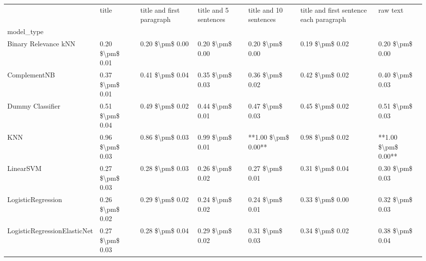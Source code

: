 \begin{tabular}{lllllll}
\toprule
{} &            title & title and first paragraph & title and 5 sentences & title and 10 sentences & title and first sentence each paragraph &             raw text \\
model\_type                      &                  &                           &                       &                        &                                         &                      \\
\midrule
Binary Relevance kNN            &  0.20 \$\textbackslash pm\$ 0.01 &           0.20 \$\textbackslash pm\$ 0.00 &       0.20 \$\textbackslash pm\$ 0.00 &        0.20 \$\textbackslash pm\$ 0.00 &                         0.19 \$\textbackslash pm\$ 0.02 &      0.20 \$\textbackslash pm\$ 0.00 \\
ComplementNB                    &  0.37 \$\textbackslash pm\$ 0.01 &           0.41 \$\textbackslash pm\$ 0.04 &       0.35 \$\textbackslash pm\$ 0.03 &        0.36 \$\textbackslash pm\$ 0.02 &                         0.42 \$\textbackslash pm\$ 0.02 &      0.40 \$\textbackslash pm\$ 0.03 \\
Dummy Classifier                &  0.51 \$\textbackslash pm\$ 0.04 &           0.49 \$\textbackslash pm\$ 0.02 &       0.44 \$\textbackslash pm\$ 0.01 &        0.47 \$\textbackslash pm\$ 0.03 &                         0.45 \$\textbackslash pm\$ 0.02 &      0.51 \$\textbackslash pm\$ 0.03 \\
KNN                             &  0.96 \$\textbackslash pm\$ 0.03 &           0.86 \$\textbackslash pm\$ 0.03 &       0.99 \$\textbackslash pm\$ 0.01 &    **1.00 \$\textbackslash pm\$ 0.00** &                         0.98 \$\textbackslash pm\$ 0.02 &  **1.00 \$\textbackslash pm\$ 0.00** \\
LinearSVM                       &  0.27 \$\textbackslash pm\$ 0.03 &           0.28 \$\textbackslash pm\$ 0.03 &       0.26 \$\textbackslash pm\$ 0.02 &        0.27 \$\textbackslash pm\$ 0.01 &                         0.31 \$\textbackslash pm\$ 0.04 &      0.30 \$\textbackslash pm\$ 0.03 \\
LogisticRegression              &  0.26 \$\textbackslash pm\$ 0.02 &           0.29 \$\textbackslash pm\$ 0.02 &       0.24 \$\textbackslash pm\$ 0.02 &        0.24 \$\textbackslash pm\$ 0.01 &                         0.33 \$\textbackslash pm\$ 0.00 &      0.32 \$\textbackslash pm\$ 0.03 \\
LogisticRegressionElasticNet    &  0.27 \$\textbackslash pm\$ 0.03 &           0.28 \$\textbackslash pm\$ 0.04 &       0.29 \$\textbackslash pm\$ 0.02 &        0.31 \$\textbackslash pm\$ 0.03 &                         0.34 \$\textbackslash pm\$ 0.02 &      0.38 \$\textbackslash pm\$ 0.04 \\

\end{tabular}

